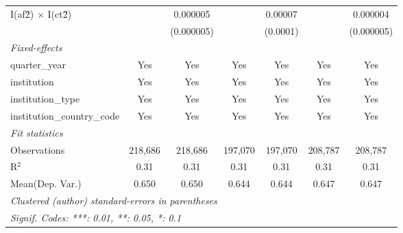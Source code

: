 \begin{tabular}{lcccccc}
   I(af\^2) $\times$ I(ct\^2)         &               & 0.000005       &               & 0.00007       &               & 0.000004\\   
                                      &               & (0.000005)     &               & (0.0001)      &               & (0.000005)\\   
   \midrule
   \emph{Fixed-effects}\\
   quarter\_year                      & Yes           & Yes            & Yes           & Yes           & Yes           & Yes\\  
   institution                        & Yes           & Yes            & Yes           & Yes           & Yes           & Yes\\  
   institution\_type                  & Yes           & Yes            & Yes           & Yes           & Yes           & Yes\\  
   institution\_country\_code         & Yes           & Yes            & Yes           & Yes           & Yes           & Yes\\  
   \midrule
   \emph{Fit statistics}\\
   Observations                       & 218,686       & 218,686        & 197,070       & 197,070       & 208,787       & 208,787\\  
   R$^2$                              & 0.31          & 0.31           & 0.31          & 0.31          & 0.31          & 0.31\\  
Mean(Dep. Var.) & 0.650 & 0.650 & 0.644 & 0.644 & 0.647 & 0.647 \\
   \midrule \midrule
   \multicolumn{7}{l}{\emph{Clustered (author) standard-errors in parentheses}}\\
   \multicolumn{7}{l}{\emph{Signif. Codes: ***: 0.01, **: 0.05, *: 0.1}}\\
\end{tabular}
\par\endgroup
